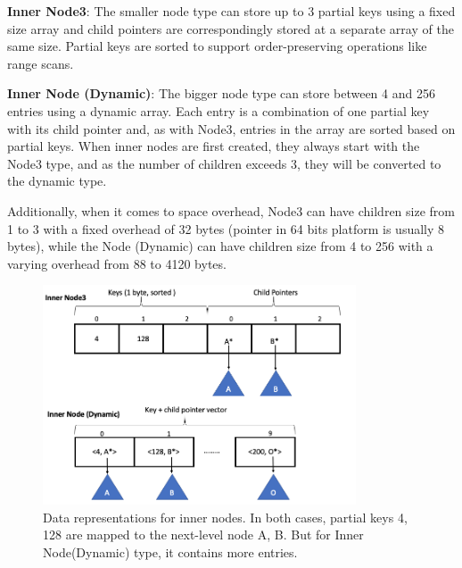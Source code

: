 \documentclass[sigplan,screen,nonacm]{acmart}
\begin{document}
\textbf {Inner Node3}: The smaller node type can store up to 3 partial keys using a fixed size array and child pointers are correspondingly stored at a separate array of the same size. Partial keys are sorted to support order-preserving operations like range scans. 

\textbf {Inner Node (Dynamic)}: The bigger node type can store between 4 and 256 entries using a dynamic array. Each entry is a combination of one partial key with its child pointer and, as with Node3, entries in the array are sorted based on partial keys. When inner nodes are first created, they always start with the Node3 type, and as the number of children exceeds 3, they will be converted to the dynamic type.  

Additionally, when it comes to space overhead, Node3 can have children size from 1 to 3 with a fixed overhead of 32 bytes (pointer in 64 bits platform is usually 8 bytes), while the Node (Dynamic) can have children size from 4 to 256 with a varying overhead from 88 to 4120 bytes. 
\begin{figure}[t]
  \centering
  \includegraphics[width=\linewidth, height=6.5cm]{pic/inner nodes.png}
  \setlength{\belowcaptionskip}{-7pt} 
  \caption{Data representations for inner nodes. In both cases, partial keys 4, 128 are mapped to the next-level node A, B. But for Inner Node(Dynamic) type, it contains more entries.}
  \label{fig:inner-nodes}
\end{figure}
\end{document}
